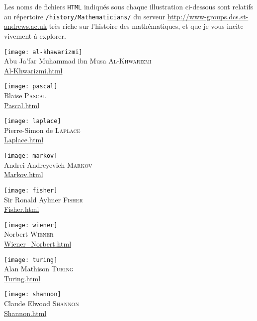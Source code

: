 {{Les noms de fichiers \texttt{HTML} indiqués sous chaque illustration
ci-dessous sont relatifs au répertoire \texttt{/history/Mathematicians/} du
serveur \url{http://www-groups.dcs.st-andrews.ac.uk} très riche sur l'histoire
des mathématiques, et que je vous incite vivement à explorer.

\bigskip

\begin{multicols}{2}

\begin{center}

\texttt{[image: al-khawarizmi]}\\
Abu Ja'far Muhammad ibn Musa \textsc{Al-Khwarizmi}\\ 
\url{Al-Khwarizmi.html}

\bigskip

\texttt{[image: pascal]}\\
Blaise \textsc{Pascal}\\
\url{Pascal.html}

\bigskip

\texttt{[image: laplace]}\\
Pierre-Simon de \textsc{Laplace}\\
\url{Laplace.html}

\bigskip

\texttt{[image: markov]}\\
Andrei Andreyevich \textsc{Markov}\\
\url{Markov.html}

\bigskip

\texttt{[image: fisher]}\\
Sir Ronald Aylmer \textsc{Fisher}\\
\url{Fisher.html}

\bigskip

\texttt{[image: wiener]}\\
Norbert \textsc{Wiener}\\
\url{Wiener_Norbert.html}

\bigskip

\texttt{[image: turing]}\\
Alan Mathison \textsc{Turing}\\
\url{Turing.html}

\bigskip

\texttt{[image: shannon]}\\
Claude Elwood \textsc{Shannon}\\
\url{Shannon.html}


\end{center}
\end{multicols}}}
